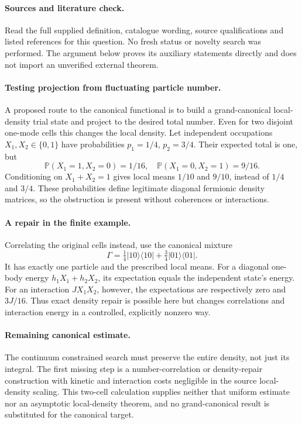 \documentclass[11pt]{article}
\begin{document}
\paragraph{Sources and literature check.}
Read the full supplied definition, catalogue wording, source qualifications and listed references for this question. No fresh status or novelty search was performed. The argument below proves its auxiliary statements directly and does not import an unverified external theorem.

\paragraph{Testing projection from fluctuating particle number.} A proposed route to the canonical functional is to build a grand-canonical local-density trial state and project to the desired total number. Even for two disjoint one-mode cells this changes the local density. Let independent occupations \(X_1,X_2\in\{0,1\}\) have probabilities \(p_1=1/4\), \(p_2=3/4\). Their expected total is one, but
\[
 \mathbb P(X_1=1,X_2=0)=1/16,\quad
 \mathbb P(X_1=0,X_2=1)=9/16.
\]
Conditioning on \(X_1+X_2=1\) gives local means \(1/10\) and \(9/10\), instead of \(1/4\) and \(3/4\). These probabilities define legitimate diagonal fermionic density matrices, so the obstruction is present without coherences or interactions.
\paragraph{A repair in the finite example.} Correlating the original cells instead, use the canonical mixture
\[
 \Gamma=\tfrac14|10\rangle\langle10|+\tfrac34|01\rangle\langle01|.
\]
It has exactly one particle and the prescribed local means. For a diagonal one-body energy \(h_1X_1+h_2X_2\), its expectation equals the independent state's energy. For an interaction \(JX_1X_2\), however, the expectations are respectively zero and \(3J/16\). Thus exact density repair is possible here but changes correlations and interaction energy in a controlled, explicitly nonzero way.
\paragraph{Remaining canonical estimate.} The continuum constrained search must preserve the entire density, not just its integral. The first missing step is a number-correlation or density-repair construction with kinetic and interaction costs negligible in the source local-density scaling. This two-cell calculation supplies neither that uniform estimate nor an asymptotic local-density theorem, and no grand-canonical result is substituted for the canonical target.
\end{document}
